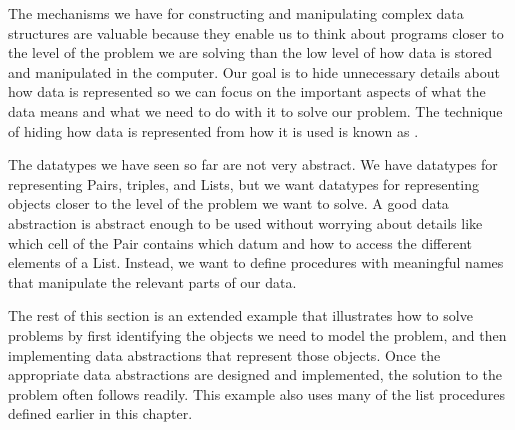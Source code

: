 \begin{schemeregion}
The mechanisms we have for constructing and manipulating complex data structures are valuable because they enable us to think about programs closer to the level of the problem we are solving than the low level of how data is stored and manipulated in the computer.  Our goal is to hide unnecessary details about how data is represented so we can focus on the important aspects of what the data means and what we need to do with it to solve our problem.  The technique of hiding how data is represented from how it is used is known as .  

The datatypes we have seen so far are not very abstract.  We have datatypes for representing Pairs, triples, and Lists, but we want datatypes for representing objects closer to the level of the problem we want to solve.  A good data abstraction is abstract enough to be used without worrying about details like which cell of the Pair contains which datum and how to access the different elements of a List.  Instead, we want to define procedures with meaningful names that manipulate the relevant parts of our data.  

The rest of this section is an extended example that illustrates how to solve problems by first identifying the objects we need to model the problem, and then implementing data abstractions that represent those objects.  Once the appropriate data abstractions are designed and implemented, the solution to the problem often follows readily.  This example also uses many of the list procedures defined earlier in this chapter.

{}
\end{schemeregion}
